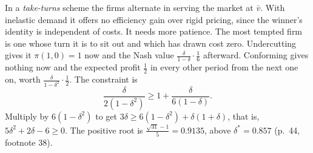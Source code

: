 In a \emph{take-turns} scheme the firms alternate in serving the market at $\bar v$. With inelastic demand it offers
no efficiency gain over rigid pricing, since the winner's identity is independent of costs. It needs more patience.
The most tempted firm is one whose turn it is to sit out and which has drawn cost zero. Undercutting gives it
$\pi(1, 0) = 1$ now and the Nash value $\frac{\delta}{1 - \delta}\cdot\frac{1}{6}$ afterward. Conforming gives nothing
now and the expected profit $\frac{1}{2}$ in every other period from the next one on, worth
$\frac{\delta}{1 - \delta^2}\cdot\frac{1}{2}$. The constraint is
\begin{equation*}
\frac{\delta}{2(1 - \delta^2)} \ge 1 + \frac{\delta}{6(1 - \delta)} .
\end{equation*}
Multiply by $6(1 - \delta^2)$ to get $3\delta \ge 6(1 - \delta^2) + \delta(1 + \delta)$, that is,
$5\delta^2 + 2\delta - 6 \ge 0$. The positive root is $\frac{\sqrt{31} - 1}{5} = 0.9135$, above $\delta^* = 0.857$
(p.~44, footnote 38).

